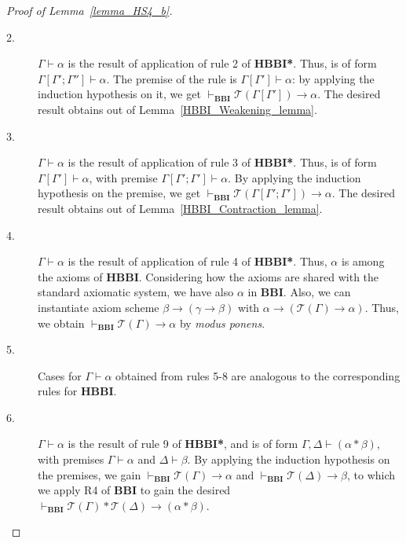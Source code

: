 \documentclass[a4paper]{article}
\newcommand{\BBI}{\textbf{BBI}\xspace}
\begin{document}
\begin{proof}[Proof of Lemma~\ref{lemma_HS4_b}]
\begin{description}
     \item[2.] $\Gamma \vdash \alpha$ is the result of application of rule 2 of \textbf{HBBI*}. Thus, is of form $\Gamma[\Gamma'; \Gamma''] \vdash \alpha$. The premise of the rule is $\Gamma[\Gamma'] \vdash \alpha$: by applying the induction hypothesis on it, we get $\vdash_{\BBI}\mathcal{T}(\Gamma[\Gamma'])\rightarrow \alpha$. The desired result obtains out of Lemma~\ref{HBBI_Weakening_lemma}.  
     

     \item[3.] $\Gamma \vdash \alpha$ is the result of application of rule 3 of \textbf{HBBI*}. Thus, is of form $\Gamma[\Gamma']\vdash \alpha$, with premise $\Gamma[\Gamma'; \Gamma']\vdash \alpha$. By applying the induction hypothesis on the premise, we get $\vdash_{\BBI}\mathcal{T}(\Gamma[\Gamma'; \Gamma'])\rightarrow \alpha$. The desired result obtains out of Lemma~\ref{HBBI_Contraction_lemma}.


    \item [4.] $\Gamma \vdash \alpha$ is the result of application of rule 4 of \textbf{HBBI*}. Thus, $\alpha$ is among the axioms of \textbf{HBBI}. Considering how the axioms are shared with the standard axiomatic system, we have also $\alpha$ in \BBI. Also, we can instantiate axiom scheme $\beta \rightarrow (\gamma \rightarrow \beta)$ with $\alpha \rightarrow (\mathcal{T}(\Gamma) \rightarrow \alpha)$. Thus, we obtain $\vdash_{\BBI}\mathcal{T}(\Gamma) \rightarrow \alpha$ by \textit{modus ponens}.


    \item[5.] Cases for $\Gamma \vdash \alpha$ obtained from rules 5-8 are analogous to the corresponding rules for \textbf{HBBI}.

     \item[6.] $\Gamma \vdash \alpha$ is the result of rule 9 of \textbf{HBBI*}, and is of form $\Gamma, \Delta \vdash (\alpha * \beta)$, with premises $\Gamma\vdash \alpha$ and $\Delta \vdash \beta$. By applying the induction hypothesis on the premises, we gain $\vdash_{\BBI}\mathcal{T}(\Gamma)\rightarrow \alpha$ and $\vdash_{\BBI}\mathcal{T}(\Delta) \rightarrow \beta$, to which we apply R4 of \BBI to gain the desired $\vdash_{\BBI}\mathcal{T}(\Gamma) * \mathcal{T}(\Delta) \rightarrow (\alpha * \beta)$. 

\end{description}
    
\end{proof}
\end{document}
